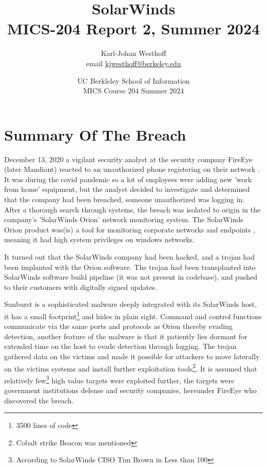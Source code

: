 \documentclass[
	letterpaper, %
	10pt, %
	unnumberedsections, %
	twoside, %
]{LTJournalArticle}
\title{SolarWinds \\ MICS-204 Report 2, Summer 2024} %
\author{
	Karl-Johan Westhoff \\
	email \href{mailto:kjwesthoff@berkeley.edu}{kjwesthoff@berkeley.edu}
}
\date{UC Berkleley School of Information \\
MICS Course 204 Summer 2024
}
\begin{document}
\maketitle %


\section{Summary Of The Breach}
December 13, 2020 a vigilant security analyst at the security company FireEye (later Mandiant) reacted to an unauthorized phone registering on their network \cite{CNN_FireEye}. It was during the covid pandemic so a lot of employees were adding new 'work from home' equipment, but the analyst decided to investigate and determined that the company had been breached, someone unauthorized was logging in. After a thorough search through systems, the breach was isolated to origin in the company's 'SolarWinds Orion' network monitoring system. The SolarWinds Orion product was(is) a tool for monitoring corporate networks and endpoints \cite{SolarWindsOrion}, meaning it had high system privileges on windows networks. \par
It turned out that the SolarWinds company had been hacked, and a trojan had been implanted with the Orion software. The trojan had been transplanted into SolarWinds software build pipeline (it was not present in codebase), and pushed to their customers with digitally signed updates. \par
Sunburst is a sophisticated malware deeply integrated with its SolarWinds host, it has a small footprint\footnote{3500 lines of code} and hides in plain sight. Command and control functions communicate via the same ports and protocols as Orion thereby evading detection, another feature of the malware is that it patiently lies dormant for extended time on the host to evade detection through logging. The trojan gathered data on the victims and made it possible for attackers to move laterally on the victims systems and install further exploitation tools\footnote{Cobalt strike Beacon was mentioned\cite{Mandiant}}. It is assumed that relatively few\footnote{According to SolarWinds CISO Tim Brown in \cite{SolarWindsCISO} Less than 100} high value targets were exploited further, the targets were government institutions defense and security companies, hereunder FireEye who discovered the breach.
\end{document}
